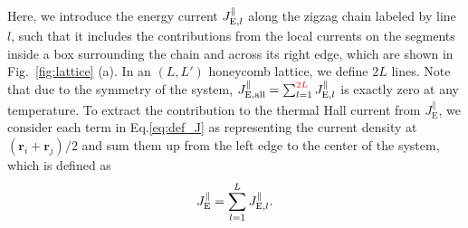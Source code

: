 \documentclass[twocolumn,superscriptaddress,showpacs, longbibliography, aps, prb]{revtex4-2}
\newcommand{\red}[1]{\textcolor{red}{#1}}
\newcommand{\blue}[1]{\textcolor{blue}{#1}}
\newcommand{\orange}[1]{\textcolor{orange}{#1}}
\begin{document}
Here, we introduce the energy current $J_{{\rm E},l}^\parallel$ along the zigzag chain labeled by line $l$, such that %
it includes the contributions from the local currents on the segments inside %
a box surrounding the chain and across its right edge, which are shown in Fig.~\ref{fig:lattice} (a). 
In an $(L, L')$ honeycomb lattice, we define $2L$ lines.
Note that due to the symmetry of the system, %
 $J_{\mathrm{E},{\rm all}}^{\parallel}=\sum_{l=1}^{\red{2L}}J_{{\rm E},l}^\parallel$ is exactly %
 zero %
 at any temperature.
 To %
 extract the
 contribution to the thermal Hall current from %
 {$J_{\mathrm{E}}^{\parallel}$}, we consider %
 each term in Eq.\eqref{eq:def_J} %
 as representing the current density at $(\bm{r}_i + \bm{r}_j)/2$ and sum them up from the left edge to the center of the system, which is defined as
\begin{align}
J_{\rm E}^\parallel=\sum_{l=1}^{L}J_{{\rm E},l}^\parallel.
\label{eq:JE}
\end{align} 

\end{document}
